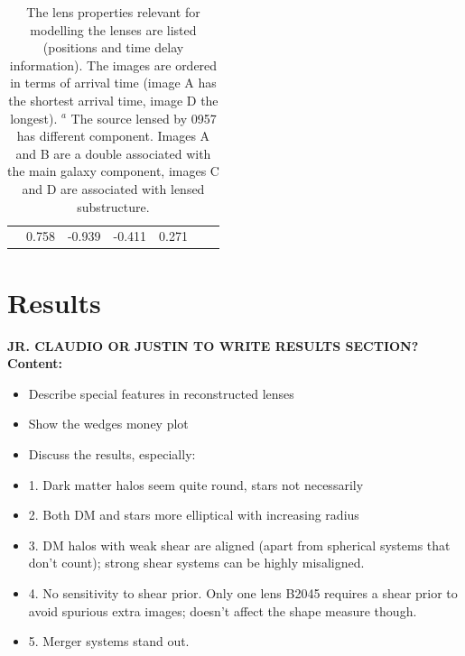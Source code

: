 \documentclass[useAMS,usenatbib]{mn2e}
\begin{document}
\begin{table}
\begin{center}
\begin{tabular}{l r r r r l l}
              & 0.758 & -0.939 & -0.411 & 0.271 &  &  \\
    \end{tabular}
    \caption[width=\linewidth]{The lens properties relevant for modelling the lenses are listed (positions and time delay information). The images are ordered in terms of arrival time (image A has the shortest arrival time, image D the longest). \newline $^{a}$ The source lensed by 0957 has different component. Images A and B are a double associated with the main galaxy component, images C and D are associated with lensed substructure.}
    \label{tab:lensmodelling}
  \end{center}
\end{table}


\section{Results}\label{sec:results}

{\bf JR. CLAUDIO OR JUSTIN TO WRITE RESULTS SECTION?} 
\textbf{Content:}
\begin{itemize}
\item Describe special features in reconstructed lenses
\item Show the wedges money plot
\item Discuss the results, especially:
\item 1. Dark matter halos seem quite round, stars not necessarily
\item 2. Both DM and stars more elliptical with increasing radius 
\item 3. DM halos with weak shear are aligned (apart from spherical systems that don't count); strong shear systems can be highly misaligned.
\item 4. No sensitivity to shear prior. Only one lens B2045 requires a shear prior to avoid spurious extra images; doesn't affect the shape measure though. 
\item 5. Merger systems stand out. 
\end{itemize}
\end{document}
